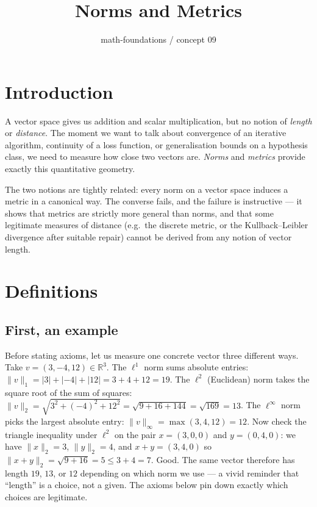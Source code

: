 \documentclass[11pt]{article}
\title{Norms and Metrics}
\author{math-foundations / concept 09}
\date{}
\theoremstyle{definition}
\theoremstyle{plain}
\begin{document}
\maketitle

\section{Introduction}

A vector space gives us addition and scalar multiplication, but no notion
of \emph{length} or \emph{distance}. The moment we want to talk about
convergence of an iterative algorithm, continuity of a loss function, or
generalisation bounds on a hypothesis class, we need to measure how close
two vectors are. \emph{Norms} and \emph{metrics} provide exactly this
quantitative geometry.

The two notions are tightly related: every norm on a vector space induces
a metric in a canonical way. The converse fails, and the failure is
instructive --- it shows that metrics are strictly more general than
norms, and that some legitimate measures of distance (e.g.\ the discrete
metric, or the Kullback--Leibler divergence after suitable repair) cannot
be derived from any notion of vector length.

\section{Definitions}

\subsection*{First, an example}
Before stating axioms, let us measure one concrete vector three different
ways. Take $v = (3, -4, 12) \in \mathbb{R}^3$.
The $\ell^1$ norm sums absolute entries:
$\|v\|_1 = |3| + |-4| + |12| = 3 + 4 + 12 = 19$.
The $\ell^2$ (Euclidean) norm takes the square root of the sum of squares:
$\|v\|_2 = \sqrt{3^2 + (-4)^2 + 12^2} = \sqrt{9 + 16 + 144} = \sqrt{169} = 13$.
The $\ell^\infty$ norm picks the largest absolute entry:
$\|v\|_\infty = \max(3, 4, 12) = 12$.
Now check the triangle inequality under $\ell^2$ on the pair
$x = (3, 0, 0)$ and $y = (0, 4, 0)$: we have
$\|x\|_2 = 3$, $\|y\|_2 = 4$, and $x + y = (3, 4, 0)$ so
$\|x + y\|_2 = \sqrt{9 + 16} = 5 \le 3 + 4 = 7$. Good.
The same vector therefore has length $19$, $13$, or $12$ depending on
which norm we use --- a vivid reminder that ``length'' is a choice, not a
given. The axioms below pin down exactly which choices are legitimate.
\end{document}
